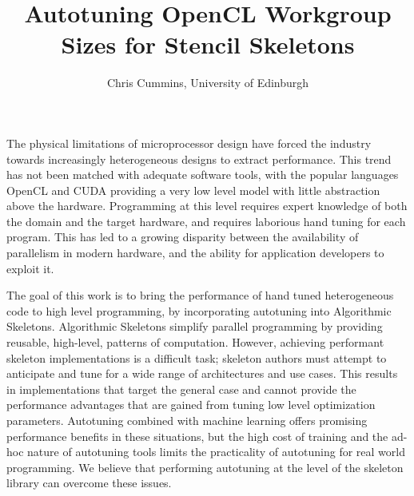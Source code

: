 %
%
%
%
%
%


\usepackage{pdfpages}



\title{Autotuning OpenCL Workgroup Sizes for Stencil Skeletons}

\author{Chris Cummins, University of Edinburgh}

\maketitle

The physical limitations of microprocessor design have forced the
industry towards increasingly heterogeneous designs to extract
performance. This trend has not been matched with adequate software
tools, with the popular languages OpenCL and CUDA providing a very low
level model with little abstraction above the hardware. Programming at
this level requires expert knowledge of both the domain and the target
hardware, and requires laborious hand tuning for each program. This
has led to a growing disparity between the availability of parallelism
in modern hardware, and the ability for application developers to
exploit it.

The goal of this work is to bring the performance of hand tuned
heterogeneous code to high level programming, by incorporating
autotuning into Algorithmic Skeletons. Algorithmic Skeletons simplify
parallel programming by providing reusable, high-level, patterns of
computation. However, achieving performant skeleton implementations is
a difficult task; skeleton authors must attempt to anticipate and tune
for a wide range of architectures and use cases. This results in
implementations that target the general case and cannot provide the
performance advantages that are gained from tuning low level
optimization parameters. Autotuning combined with machine learning
offers promising performance benefits in these situations, but the
high cost of training and the ad-hoc nature of autotuning tools limits
the practicality of autotuning for real world programming. We believe
that performing autotuning at the level of the skeleton library can
overcome these issues.

